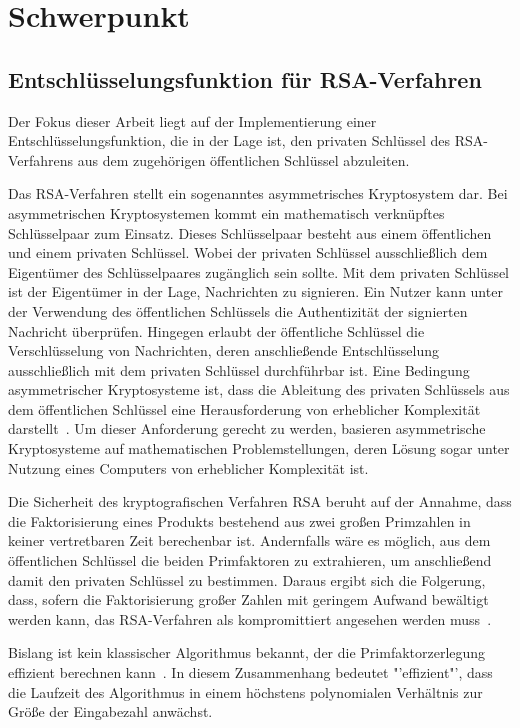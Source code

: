 \section{Schwerpunkt}
\subsection{Entschlüsselungsfunktion für RSA-Verfahren} 
Der Fokus dieser Arbeit liegt auf der Implementierung einer Entschlüsselungsfunktion, die in der Lage ist, 
den privaten Schlüssel des RSA-Verfahrens aus dem zugehörigen öffentlichen Schlüssel abzuleiten.

Das RSA-Verfahren stellt ein sogenanntes asymmetrisches Kryptosystem dar.
Bei asymmetrischen Kryptosystemen kommt ein mathematisch verknüpftes Schlüsselpaar zum Einsatz. 
Dieses Schlüsselpaar besteht aus einem öffentlichen und einem privaten Schlüssel.
Wobei der privaten Schlüssel ausschließlich dem Eigentümer des Schlüsselpaares zugänglich sein sollte.
Mit dem privaten Schlüssel ist der Eigentümer in der Lage, Nachrichten zu signieren. 
Ein Nutzer kann unter der Verwendung des öffentlichen Schlüssels die Authentizität der signierten Nachricht überprüfen. 
Hingegen erlaubt der öffentliche Schlüssel die Verschlüsselung von Nachrichten, 
deren anschließende Entschlüsselung ausschließlich mit dem privaten Schlüssel durchführbar ist.
Eine Bedingung asymmetrischer Kryptosysteme ist, 
dass die Ableitung des privaten Schlüssels aus dem öffentlichen Schlüssel eine Herausforderung von erheblicher Komplexität darstellt~\cite{1055638}. 
Um dieser Anforderung gerecht zu werden, basieren asymmetrische Kryptosysteme auf mathematischen Problemstellungen, 
deren Lösung sogar unter Nutzung eines Computers von erheblicher Komplexität ist.

Die Sicherheit des kryptografischen Verfahren RSA beruht auf der Annahme,
dass die Faktorisierung eines Produkts bestehend aus zwei großen Primzahlen in keiner vertretbaren Zeit berechenbar ist.
Andernfalls wäre es möglich, aus dem öffentlichen Schlüssel die beiden Primfaktoren zu extrahieren, 
um anschließend damit den privaten Schlüssel zu bestimmen.
Daraus ergibt sich die Folgerung, dass, sofern die Faktorisierung großer Zahlen mit geringem Aufwand bewältigt werden kann, 
das RSA-Verfahren als kompromittiert angesehen werden muss~\cite{Cormen2009}.

Bislang ist kein klassischer Algorithmus bekannt, der die Primfaktorzerlegung effizient berechnen kann~\cite{Hoever2022Krypto}.
In diesem Zusammenhang bedeutet "'effizient"', dass die Laufzeit des Algorithmus in einem höchstens polynomialen Verhältnis zur Größe der Eingabezahl anwächst.

